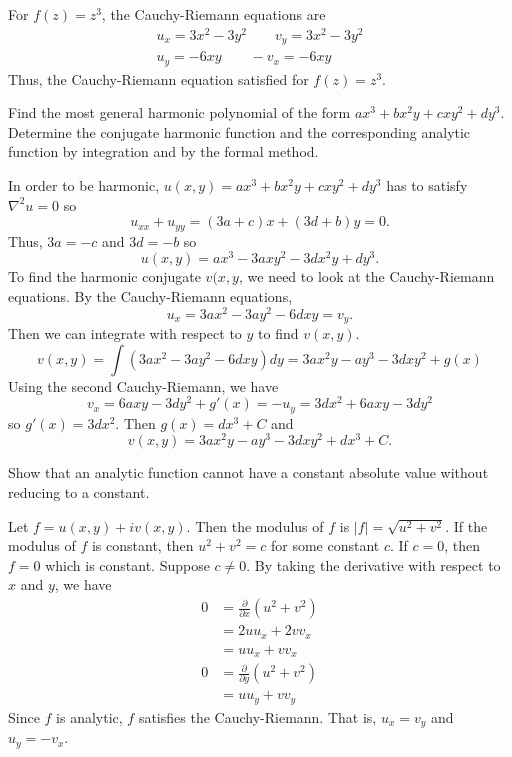 \begin{exercise}
  For \(f(z) = z^3\), the Cauchy-Riemann equations are
  \begin{gather*}
    u_x = 3x^2 - 3y^2 \qquad v_y = 3x^2 - 3y^2\\
    u_y = -6xy \qquad -v_x = -6xy
  \end{gather*}
  Thus, the Cauchy-Riemann equation satisfied for \(f(z) = z^3\).
\item
  Find the most general harmonic polynomial of the form
  \(ax^3 + bx^2y + cxy^2 + dy^3\).
  Determine the conjugate harmonic function and the corresponding analytic
  function by integration and by the formal method.
  \par\smallskip
  In order to be harmonic, \(u(x,y) = ax^3 + bx^2y + cxy^2 + dy^3\) has to
  satisfy \(\nabla^2u = 0\) so
  \[
  u_{xx} + u_{yy} = (3a + c)x + (3d + b)y = 0.
  \]
  Thus, \(3a = -c\) and \(3d = -b\) so
  \[
  u(x,y) = ax^3 - 3axy^2 - 3dx^2y + dy^3.
  \]
  To find the harmonic conjugate \(v(x,y\), we need to look at the
  Cauchy-Riemann equations.
  By the Cauchy-Riemann equations,
  \[
  u_x = 3ax^2 - 3ay^2 - 6dxy = v_y.
  \]
  Then we can integrate with respect to \(y\) to find \(v(x,y)\).
  \[
  v(x,y) = \int(3ax^2 - 3ay^2 - 6dxy)dy = 3ax^2y - ay^3 - 3dxy^2 + g(x)
  \]
  Using the second Cauchy-Riemann, we have
  \[
  v_x = 6axy - 3dy^2 + g'(x) = -u_y = 3dx^2 + 6axy - 3dy^2
  \]
  so \(g'(x) = 3dx^2\).
  Then \(g(x) = dx^3 + C\) and
  \[
  v(x,y) = 3ax^2y - ay^3 - 3dxy^2 + dx^3 + C.
  \]
\item
  Show that an analytic function cannot have a constant absolute value without
  reducing to a constant.
  \par\smallskip
  Let \(f = u(x,y) + iv(x,y)\).
  Then the modulus of \(f\) is \(\lvert f\rvert = \sqrt{u^2 + v^2}\).
  If the modulus of \(f\) is constant, then \(u^2 + v^2 = c\) for some constant
  \(c\).
  If \(c = 0\), then \(f = 0\) which is constant.
  Suppose \(c\neq 0\).
  By taking the derivative with respect to \(x\) and \(y\), we have
  \begin{align*}
    0 & = \frac{\partial}{\partial x}(u^2 + v^2)\\
      & = 2uu_x + 2vv_x\\
      & = uu_x + vv_x\\
    0 & = \frac{\partial}{\partial y}(u^2 + v^2)\\
      & = uu_y + vv_y
  \end{align*}
  Since \(f\) is analytic, \(f\) satisfies the Cauchy-Riemann.
  That is, \(u_x = v_y\) and \(u_y = -v_x\).
  \begin{subequations}

\end{subequations}
\end{exercise}
